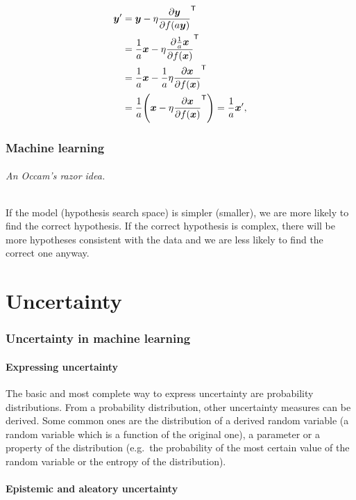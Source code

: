 \documentclass{article}
\begin{document}
\begin{align}
    \vec y' 
    &= \vec y - \eta\pd{\vec y}{f(a\vec y)} ^\tp \\
    &= \frac{1}{a}\vec x -\eta\pd{\frac{1}{a}\vec x}{f(\vec x)}^\tp \\
    &= \frac{1}{a}\vec x -\frac{1}{a}\eta\pd{\vec x}{f(\vec x)}^\tp \\
    &= \frac{1}{a}\del{\vec x -\eta\pd{\vec x}{f(\vec x)}^\tp} = \frac{1}{a}\vec x' \text{,}
\end{align}

\section{Machine learning}

\paragraph{An Occam's razor idea.} If the model (hypothesis search space) is simpler (smaller), we are more likely to find the correct hypothesis. If the correct hypothesis is complex, there will be more hypotheses consistent with the data and we are less likely to find the correct one anyway.




\part{Uncertainty}



\section{Uncertainty in machine learning}

\subsection{Expressing uncertainty}

The basic and most complete way to express uncertainty are probability distributions. From a probability distribution, other uncertainty measures can be derived. Some common ones are the distribution of a derived random variable (a random variable which is a function of the original one), a parameter or a property of the distribution (e.g.\ the probability of the most certain value of the random variable or the entropy of the distribution).


\subsection{Epistemic and aleatory uncertainty}
\end{document}

